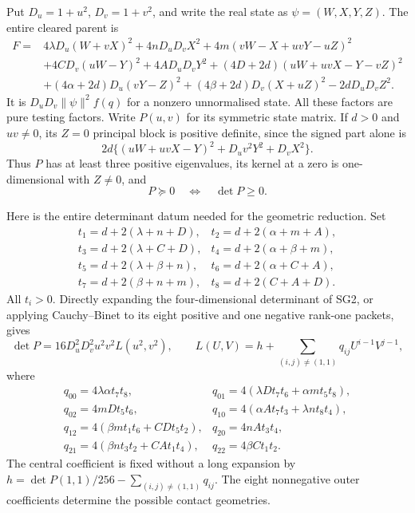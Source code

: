 Put $D_u=1+u^2$, $D_v=1+v^2$, and write the real state as
$\psi=(W,X,Y,Z)$.  The entire cleared parent is
\[
\begin{split}
 F={}&4\lambda D_u(W+vX)^2+4nD_uD_vX^2
       +4m(vW-X+uvY-uZ)^2\\
 &+4CD_v(uW-Y)^2+4AD_uD_vY^2
 +(4D+2d)(uW+uvX-Y-vZ)^2\\
 &+(4\alpha+2d)D_u(vY-Z)^2
 +(4\beta+2d)D_v(X+uZ)^2-2dD_uD_vZ^2.
\end{split}                                                   \tag{SG2}
\]
It is $D_uD_v\|\psi\|^2f(q)$ for a nonzero unnormalised state.
All these factors are pure testing factors.  Write $P(u,v)$ for its
symmetric state matrix.  If $d>0$ and $uv\ne0$, its $Z=0$ principal
block is positive definite, since the signed part alone is
\[
 2d\{(uW+uvX-Y)^2+D_uv^2Y^2+D_vX^2\}.                 \tag{SG3}
\]
Thus $P$ has at least three positive eigenvalues, its kernel at a
zero is one-dimensional with $Z\ne0$, and
\[
                 P\succeq0\quad\Longleftrightarrow\quad\det P\geq0.
                                                               \tag{SG4}
\]

Here is the entire determinant datum needed for the geometric
reduction.  Set
\[
\begin{array}{ll}
t_1=d+2(\lambda+n+D),&t_2=d+2(\alpha+m+A),\\
t_3=d+2(\lambda+C+D),&t_4=d+2(\alpha+\beta+m),\\
t_5=d+2(\lambda+\beta+n),&t_6=d+2(\alpha+C+A),\\
t_7=d+2(\beta+n+m),&t_8=d+2(C+A+D).
\end{array}
\]
All $t_i>0$.  Directly expanding the four-dimensional determinant of
SG2, or applying Cauchy--Binet to its eight positive and one negative
rank-one packets, gives
\[
 \det P=16D_u^2D_v^2u^2v^2L(u^2,v^2),\qquad
 L(U,V)=h+\sum_{(i,j)\ne(1,1)}q_{ij}U^{i-1}V^{j-1},       \tag{SG5}
\]
where
\[
\begin{array}{ll}
q_{00}=4\lambda\alpha t_7t_8,&
q_{01}=4(\lambda Dt_7t_6+\alpha mt_5t_8),\\
q_{02}=4mDt_5t_6,&
q_{10}=4(\alpha At_7t_3+\lambda nt_8t_4),\\
q_{12}=4(\beta mt_1t_6+CDt_5t_2),&
q_{20}=4nAt_3t_4,\\
q_{21}=4(\beta nt_3t_2+CAt_1t_4),&
q_{22}=4\beta Ct_1t_2.
\end{array}                                                   \tag{SG6}
\]
The central coefficient is fixed without a long expansion by
$h=\det P(1,1)/256-\sum_{(i,j)\ne(1,1)}q_{ij}$.
The eight nonnegative outer coefficients determine the possible
contact geometries.

